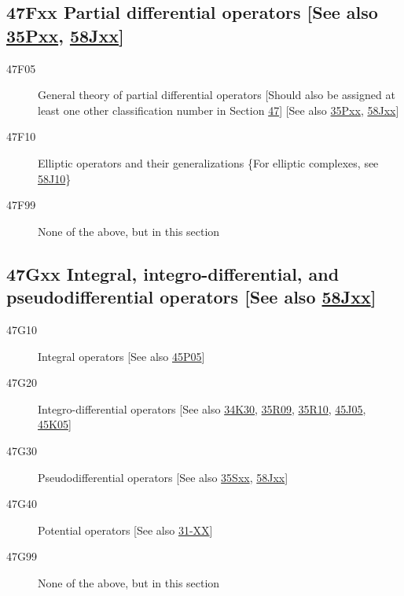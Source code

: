 \subsection*{47Fxx  Partial differential operators [See also \hyperref[35Pxx]{35Pxx}, \hyperref[58Jxx]{58Jxx}] }\label{47Fxx}
\begin{description}  
\item [47F05]\label{47F05} General theory of partial differential operators [Should also be assigned at least one other classification number in Section \hyperref[47-XX]{47}] [See also \hyperref[35Pxx]{35Pxx}, \hyperref[58Jxx]{58Jxx}]
\item [47F10]\label{47F10} Elliptic operators and their generalizations \{For elliptic complexes, see \hyperref[58J10]{58J10}\}
\item [47F99]\label{47F99} None of the above, but in this section
\end{description}
\subsection*{47Gxx  Integral, integro-differential, and pseudodifferential operators [See also \hyperref[58Jxx]{58Jxx}] }\label{47Gxx}
\begin{description}  
\item [47G10]\label{47G10} Integral operators [See also \hyperref[45P05]{45P05}]
\item [47G20]\label{47G20} Integro-differential operators [See also \hyperref[34K30]{34K30}, \hyperref[35R09]{35R09}, \hyperref[35R10]{35R10}, \hyperref[45J05]{45J05}, \hyperref[45K05]{45K05}]
\item [47G30]\label{47G30} Pseudodifferential operators [See also \hyperref[35Sxx]{35Sxx}, \hyperref[58Jxx]{58Jxx}]
\item [47G40]\label{47G40} Potential operators [See also \hyperref[31-XX]{31-XX}]
\item [47G99]\label{47G99} None of the above, but in this section
\end{description}
